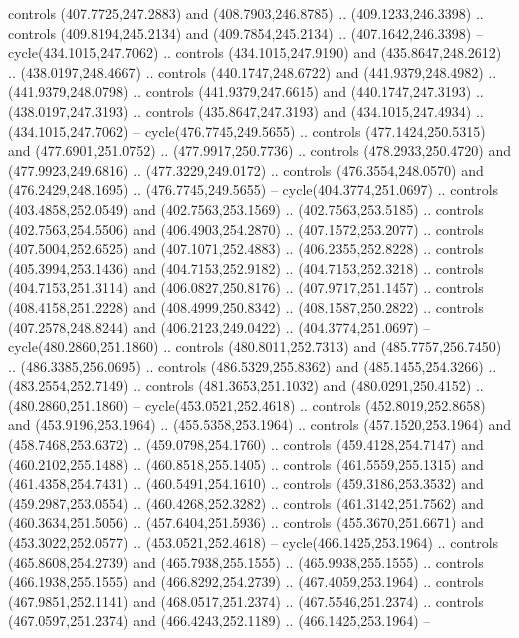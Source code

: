 \begin{scope}[cm={{1.25,0.0,0.0,-1.25,(0.0,743.43331)}}]
    controls (407.7725,247.2883) and (408.7903,246.8785) .. (409.1233,246.3398) ..
    controls (409.8194,245.2134) and (409.7854,245.2134) .. (407.1642,246.3398) --
    cycle(434.1015,247.7062) .. controls (434.1015,247.9190) and
    (435.8647,248.2612) .. (438.0197,248.4667) .. controls (440.1747,248.6722) and
    (441.9379,248.4982) .. (441.9379,248.0798) .. controls (441.9379,247.6615) and
    (440.1747,247.3193) .. (438.0197,247.3193) .. controls (435.8647,247.3193) and
    (434.1015,247.4934) .. (434.1015,247.7062) -- cycle(476.7745,249.5655) ..
    controls (477.1424,250.5315) and (477.6901,251.0752) .. (477.9917,250.7736) ..
    controls (478.2933,250.4720) and (477.9923,249.6816) .. (477.3229,249.0172) ..
    controls (476.3554,248.0570) and (476.2429,248.1695) .. (476.7745,249.5655) --
    cycle(404.3774,251.0697) .. controls (403.4858,252.0549) and
    (402.7563,253.1569) .. (402.7563,253.5185) .. controls (402.7563,254.5506) and
    (406.4903,254.2870) .. (407.1572,253.2077) .. controls (407.5004,252.6525) and
    (407.1071,252.4883) .. (406.2355,252.8228) .. controls (405.3994,253.1436) and
    (404.7153,252.9182) .. (404.7153,252.3218) .. controls (404.7153,251.3114) and
    (406.0827,250.8176) .. (407.9717,251.1457) .. controls (408.4158,251.2228) and
    (408.4999,250.8342) .. (408.1587,250.2822) .. controls (407.2578,248.8244) and
    (406.2123,249.0422) .. (404.3774,251.0697) -- cycle(480.2860,251.1860) ..
    controls (480.8011,252.7313) and (485.7757,256.7450) .. (486.3385,256.0695) ..
    controls (486.5329,255.8362) and (485.1455,254.3266) .. (483.2554,252.7149) ..
    controls (481.3653,251.1032) and (480.0291,250.4152) .. (480.2860,251.1860) --
    cycle(453.0521,252.4618) .. controls (452.8019,252.8658) and
    (453.9196,253.1964) .. (455.5358,253.1964) .. controls (457.1520,253.1964) and
    (458.7468,253.6372) .. (459.0798,254.1760) .. controls (459.4128,254.7147) and
    (460.2102,255.1488) .. (460.8518,255.1405) .. controls (461.5559,255.1315) and
    (461.4358,254.7431) .. (460.5491,254.1610) .. controls (459.3186,253.3532) and
    (459.2987,253.0554) .. (460.4268,252.3282) .. controls (461.3142,251.7562) and
    (460.3634,251.5056) .. (457.6404,251.5936) .. controls (455.3670,251.6671) and
    (453.3022,252.0577) .. (453.0521,252.4618) -- cycle(466.1425,253.1964) ..
    controls (465.8608,254.2739) and (465.7938,255.1555) .. (465.9938,255.1555) ..
    controls (466.1938,255.1555) and (466.8292,254.2739) .. (467.4059,253.1964) ..
    controls (467.9851,252.1141) and (468.0517,251.2374) .. (467.5546,251.2374) ..
    controls (467.0597,251.2374) and (466.4243,252.1189) .. (466.1425,253.1964) --

\end{scope}
